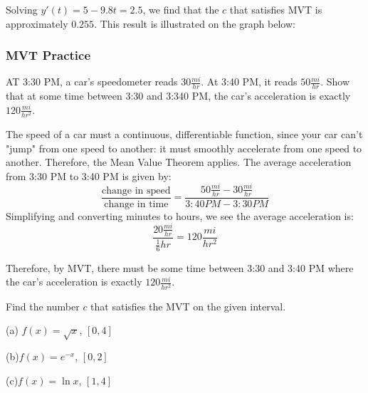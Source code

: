 Solving $y'(t) = 5-9.8t = 2.5$, we find that the $c$ that satisfies MVT is approximately $0.255$. This result is illustrated on the graph below:


\subsubsection{MVT Practice}
\begin{Exercise}
[label=MVT1]
AT 3:30 PM, a car's speedometer reads $30 \frac{mi}{hr}$. At 3:40 PM, it reads $50\frac{mi}{hr}$. Show that at some time between 3:30 and 3:340 PM, the car's acceleration is exactly $120 \frac{mi}{hr^2}$. 
\end{Exercise}
\begin{Answer}
[ref=MVT1]
The speed of a car must a continuous, differentiable function, since your car can't "jump" from one speed to another: it must smoothly accelerate from one speed to another. Therefore, the Mean Value Theorem applies. The average acceleration from 3:30 PM to 3:40 PM is given by:
$$\frac{\text{change in speed}}{\text{change in time}} = \frac{50 \frac{mi}{hr}-30\frac{mi}{hr}}{3:40PM-3:30PM}$$ 
Simplifying and converting minutes to hours, we see the average acceleration is:
$$\frac{20\frac{mi}{hr}}{\frac{1}{6}hr} = 120\frac{mi}{hr^2}$$

Therefore, by MVT, there must be some time between 3:30 and 3:40 PM where the car's acceleration is exactly $120 \frac{mi}{hr^2}$. 
\end{Answer}

\begin{Exercise}
[label=MVT2]
Find the number $c$ that satisfies the MVT on the given interval. 

(a) $f(x) = \sqrt{x}$, $[0, 4]$

(b)$f(x) = e^{-x}$, $[0,2]$

(c)$f(x) = \ln{x}$, $[1,4]$	
\end{Exercise}

